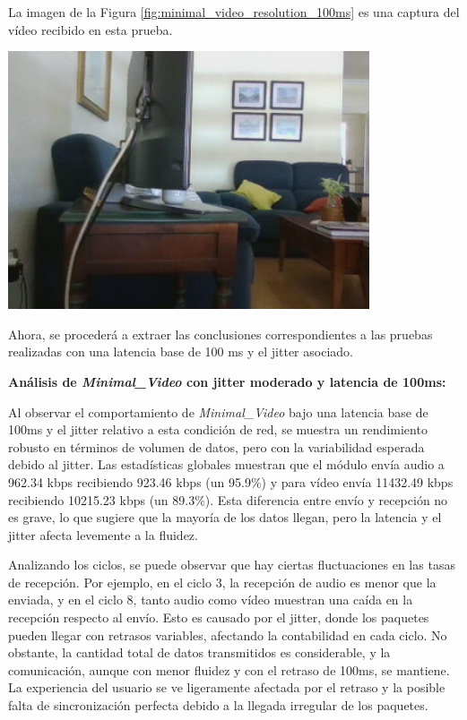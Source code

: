 \newpage
La imagen de la Figura \ref{fig:minimal_video_resolution_100ms} es una captura del vídeo recibido en esta prueba.
\begin{center}
  \includegraphics[width = 0.8\textwidth]{images/VideoRecibido5.3.png}
  \label{fig:minimal_video_resolution_100ms}
\end{center}

\newpage

Ahora, se procederá a extraer las conclusiones correspondientes a las pruebas realizadas con una latencia base de 100 ms y el jitter asociado.
\vspace{\baselineskip}

\textbf{Análisis de \textit{Minimal\_Video} con jitter moderado y latencia de 100ms:}
\vspace{\baselineskip}

Al observar el comportamiento de \textit{Minimal\_Video} bajo una latencia base de 100ms y el jitter relativo a esta condición de red, se muestra un rendimiento robusto en términos de volumen de datos, pero con la variabilidad esperada debido al jitter. Las estadísticas globales muestran que el módulo envía audio a 962.34 kbps recibiendo 923.46 kbps (un 95.9\%) y para vídeo envía 11432.49 kbps recibiendo 10215.23 kbps (un 89.3\%). Esta diferencia entre envío y recepción no es grave, lo que sugiere que la mayoría de los datos llegan, pero la latencia y el jitter afecta levemente a la fluidez.
\vspace{\baselineskip}

Analizando los ciclos, se puede observar que hay ciertas fluctuaciones en las tasas de recepción. Por ejemplo, en el ciclo 3, la recepción de audio es menor que la enviada, y en el ciclo 8, tanto audio como vídeo muestran una caída en la recepción respecto al envío. Esto es causado por el jitter, donde los paquetes pueden llegar con retrasos variables, afectando la contabilidad en cada ciclo. No obstante, la cantidad total de datos transmitidos es considerable, y la comunicación, aunque con menor fluidez y con el retraso de 100ms, se mantiene. La experiencia del usuario se ve ligeramente afectada por el retraso y la posible falta de sincronización perfecta debido a la llegada irregular de los paquetes.

